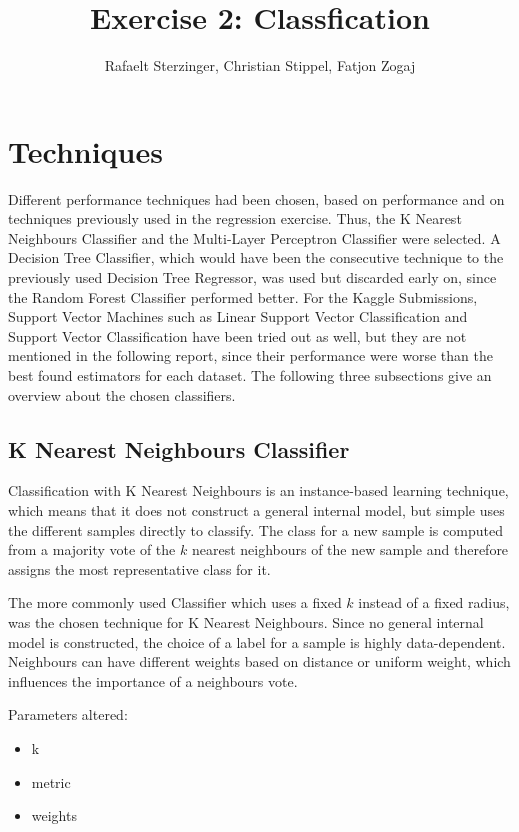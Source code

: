 \documentclass{article}
\title{Exercise 2: Classfication}
\author{Rafaelt Sterzinger, Christian Stippel, Fatjon Zogaj}
\begin{document}
\maketitle

\section{Techniques}
Different performance techniques had been chosen, based on performance and on techniques previously used in the regression exercise. Thus, the K Nearest Neighbours Classifier and the Multi-Layer Perceptron Classifier were selected. A Decision Tree Classifier, which would have been the consecutive technique to the previously used Decision Tree Regressor, was used but discarded early on, since the Random Forest Classifier performed better. For the Kaggle Submissions, Support Vector Machines such as Linear Support Vector Classification and Support Vector Classification have been tried out as well, but they are not mentioned in the following report, since their performance were worse than the best found estimators for each dataset. The following three subsections give an overview about the chosen classifiers.

\subsection{K Nearest Neighbours Classifier}
Classification with K Nearest Neighbours is an instance-based learning technique, which means that it does not construct a general internal model, but simple uses the different samples directly to classify. The class for a new sample is computed from a majority vote of the $k$ nearest neighbours of the new sample and therefore assigns the most representative class for it.

The more commonly used Classifier which uses a fixed $k$ instead of a fixed radius, was the chosen technique for K Nearest Neighbours. Since no general internal model is constructed, the choice of a label for a sample is highly data-dependent. Neighbours can have different weights based on distance or uniform weight, which influences the importance of a neighbours vote. 

Parameters altered:
\begin{itemize}
\item k
\item metric
\item weights
\end{itemize}
\end{document}
